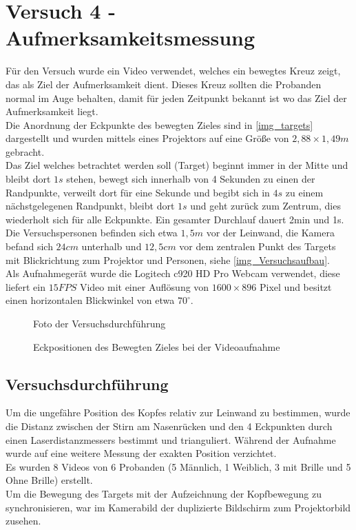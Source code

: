 \section{Versuch 4 - Aufmerksamkeitsmessung}
\label{VideoAnalyse}
Für den Versuch wurde ein Video verwendet, welches ein bewegtes Kreuz zeigt, das als Ziel der Aufmerksamkeit dient. Dieses Kreuz sollten die Probanden normal im Auge behalten, damit für jeden Zeitpunkt bekannt ist wo das Ziel der Aufmerksamkeit liegt.\\
Die Anordnung der Eckpunkte des bewegten Zieles sind in \autoref{img_targets} dargestellt und wurden mittels eines Projektors auf eine Größe von $2,88 \times 1,49 m$ gebracht.\\
Das Ziel welches betrachtet werden soll (Target) beginnt immer in der Mitte und bleibt dort $1s$ stehen, bewegt sich innerhalb von 4 Sekunden zu einen der Randpunkte, verweilt dort für eine Sekunde und begibt sich in $4s$ zu einem nächstgelegenen Randpunkt, bleibt dort $1s$ und geht zurück zum Zentrum, dies wiederholt sich für alle Eckpunkte. Ein gesamter Durchlauf dauert 2min und 1s.\\
Die Versuchspersonen befinden sich etwa $1,5m$ vor der Leinwand, die Kamera befand sich $24cm$ unterhalb und $12,5cm$ vor dem zentralen Punkt des Targets mit Blickrichtung zum Projektor und Personen, siehe \autoref{img_Versuchsaufbau}.\\
Als Aufnahmegerät wurde die Logitech c920 HD Pro Webcam verwendet, diese liefert ein $15FPS$ Video mit einer Auflösung von $1600\times 896$ Pixel und besitzt einen horizontalen Blickwinkel von etwa $70^\circ$.\\
\begin{figure}
	\centering
	\caption{Foto der Versuchsdurchführung}
	\label{img_Versuchsaufbau}
\end{figure}
\begin{figure}
\centering
{}
\caption{Eckpositionen des Bewegten Zieles bei der Videoaufnahme}
\label{img_targets}
\end{figure}
\subsection{Versuchsdurchführung}
Um die ungefähre Position des Kopfes relativ zur Leinwand zu bestimmen, wurde die Distanz zwischen der Stirn am Nasenrücken und den 4 Eckpunkten durch einen Laserdistanzmessers bestimmt und trianguliert. Während der Aufnahme wurde auf eine weitere Messung der exakten Position verzichtet.\\
Es wurden 8 Videos von 6 Probanden (5 Männlich, 1 Weiblich, 3 mit Brille und 5 Ohne Brille) erstellt.\\
Um die Bewegung des Targets mit der Aufzeichnung der Kopfbewegung zu synchronisieren, war im Kamerabild der duplizierte Bildschirm zum Projektorbild zusehen.
